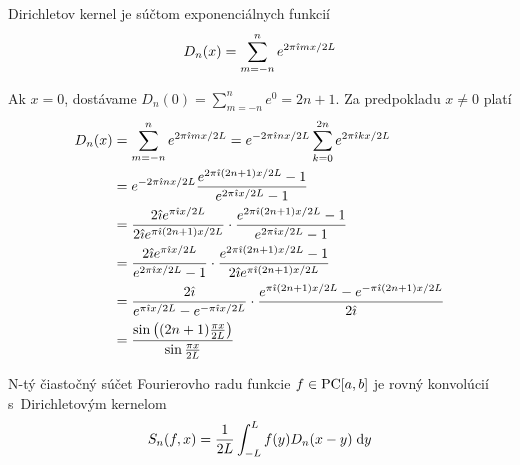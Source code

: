 \begin{lema}
    Dirichletov kernel je súčtom exponenciálnych funkcií
    \begin{equation}
        D_n(x) = \sum_{m=-n}^{n} e^{2 \pi \hat{\imath} m x/2L}
        \label{eq:dirichlet_kernel_alternative}
    \end{equation}
\end{lema}
\begin{dokaz}
    Ak $x=0$, dostávame $\displaystyle D_n(0) = \sum_{m=-n}^{n} e^0 = 2n+1$.
    Za predpokladu $x\not=0$ platí
    \begin{equation*}
    \begin{split}
        D_n(x) &= \sum_{m=-n}^n e^{2 \pi \hat{\imath} m x/2L} 
               = e^{-2 \pi \hat{\imath} n x/2L} \sum_{k=0}^{2n} 
                        e^{2 \pi \hat{\imath} k x/2L} \\
               &= e^{-2 \pi \hat{\imath} n x/2L} 
                \frac{e^{2 \pi \hat{\imath} (2n+1) x /2L}-1}{e^{2 \pi \hat{\imath}
                x/2L}-1} \\
                &= \frac{2 \hat{\imath} e^{\pi\hat{\imath} x/2L}}{
                          2 \hat{\imath} e^{\pi\hat{\imath} (2n+1) x/2L}} \cdot
                \frac{e^{2 \pi \hat{\imath} (2n+1) x /2L}-1}{e^{2 \pi \hat{\imath}
                x/2L}-1} \\
                &= \frac{2 \hat{\imath} e^{\pi \hat{\imath} x/2L}}{
                    e^{2 \pi \hat{\imath} x/2L}-1} \cdot
                    \frac{e^{2 \pi \hat{\imath} (2n+1) x /2L}-1}{
                        2 \hat{\imath} e^{\pi\hat{\imath} (2n+1) x/2L}}\\
                &= \frac{2 \hat{\imath}}{
                    e^{\pi \hat{\imath} x/2L}-e^{-\pi \hat{\imath} x/2L}} \cdot
                    \frac{e^{\pi \hat{\imath} (2n+1) x /2L}-
                        e^{-\pi \hat{\imath} (2n+1) x /2L}
                    }{2 \hat{\imath}}\\
                &= \frac{\sin\left( (2n+1)\frac{\pi x}{2L} \right)}
                        {\sin \frac{\pi x}{2L}}
    \end{split}
    \end{equation*}
\end{dokaz}

\begin{veta}
    N-tý čiastočný súčet Fourierovho radu funkcie $f \in \mbox{PC}[a,b]$ je
    rovný konvolúcií s~Dirichletovým kernelom
    \begin{equation*}
        S_n(f,x) = \frac{1}{2L} \int_{-L}^{L} f(y) D_n(x-y) \; \mathrm{d} y
    \end{equation*}
    \label{veta:dirichlet_expansion}
\end{veta}

